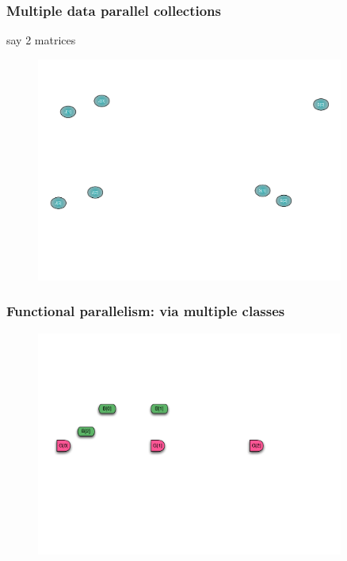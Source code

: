 \begin{frame}
  \frametitle{Multiple data parallel collections}
say 2 matrices
  \begin{figure}\includegraphics[width=0.9\textwidth]{../figures/progmodel/03-many-data-parallel-arrays.pdf}\end{figure}
\end{frame}


\begin{frame}
  \frametitle{Functional parallelism: via multiple classes}
  \begin{figure}\includegraphics[width=0.9\textwidth]{../figures/progmodel/04-func-decomp-via-classes.pdf}\end{figure}
\end{frame}


